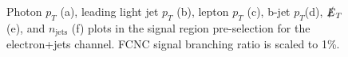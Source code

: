 \begin{figure}[h!]
\hfil
{}
\caption{Photon $p_T$ (a), leading light jet $p_T$ (b), lepton $p_T$ (c), b-jet $p_T$(d), $\slashed{E}_T$ (e), and $n_{\text{jets}}$ (f) plots in the signal region pre-selection for the electron+jets channel.  FCNC signal branching ratio is scaled to 1\%. }
\label{fig:PreSelPlots2}
\end{figure}


